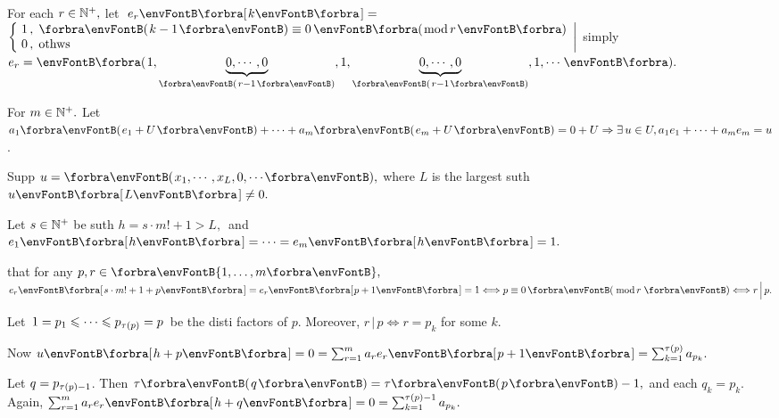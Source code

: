 \vspace{0pt}\par\quad
For each $r\in{\mathbb{N}^+},$ let $\;e_r\Sbra{k}={}${\FontSmall$\hMath[0pt]{l}{\left\{\hspace{-2pt}}{\right|}{1\,,\;\Par{k-1}\equiv 0\,\BigPar{\text{mod}\,r}\\0\,,\;\text{othws}}$} \;simply \,$e_r=\BigPar{1,\underbrace{0,\cdots,0}_{\SmallPar{r-1}},1,\underbrace{0,\cdots,0}_{\SmallPar{r-1}},1,\cdots}.$\vspace{0pt}\par\quad
For $m\in{\mathbb{N}^+}.$ Let $a_1\Par{e_1+U}+\dots+a_m\Par{e_m+U}=0+U\Rightarrow\exists\,u\in U,a_1 e_1+\dots+a_m e_m=u$.\vspace{0pt}\par\quad
Supp $u=\Par{x_1,\cdots,x_L,{0,\cdots}},$ where $L$ is the largest suth $u\Sbra{L}\neq 0.$\vspace{1pt}\par\quad
Let $s\in{\mathbb{N}^+}$ be suth $h=s\cdot m!+1> L,$ \,and \,$e_1\Sbra{h}=\cdots=e_m\Sbra{h}=1.$\vspace{1pt}\par\quad
\NOTICE that for any $p,r\in\Bra{1,\dots,m},$ \;$e_r\Sbra{s\cdot m!+1+p}=e_r\Sbra{p+1}=1\Longleftrightarrow p\equiv 0\,\Par{\,\text{mod}\,r\,}\Longleftrightarrow r\,\Big|\,p.$\par\vspace{1pt}\quad
Let \,$1=p_1\leqslant\cdots\leqslant p_{\tau(\hspace{0pt}p\hspace{0pt})}=p$\, be the disti factors of $p.$ Moreover, $r\,\Big|\,p\Longleftrightarrow r=p_k$ for some $k.$\par\vspace{1pt}\quad
Now $u\Sbra{h+p}=0=\sum_{r=1}^m a_r e_r\Sbra{p+1}=\sum_{k=1}^{\tau\TinyPar{p}}a_{p_k}.$\par\vspace{1pt}\quad
Let $q=p_{\tau(\hspace{0pt}p\hspace{0pt})-1}$. Then $\tau\Par{q}=\tau\Par{p}-1,$ and each $q_k=p_k.$ Again, $\sum_{r=1}^m a_r e_r\Sbra{h+q}=0=\sum_{k=1}^{\tau\TinyPar{p}-1}a_{p_k}.$\par\vspace{1pt}\quad
